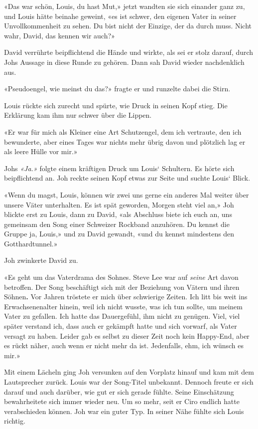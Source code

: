 «Das war schön, Louis, du hast Mut,» jetzt wandten sie sich einander
ganz zu, und Louis hätte beinahe geweint, «es ist schwer, den eigenen
Vater in seiner Unvollkommenheit zu sehen. Du bist nicht der Einzige,
der da durch muss. Nicht wahr, David, das kennen wir auch?»

David verrührte beipflichtend die Hände und wirkte, als sei er stolz
darauf, durch Johs Aussage in diese Runde zu gehören. Dann sah David
wieder nachdenklich aus.

«Pseudoengel, wie meinst du das?» fragte er und runzelte dabei die
Stirn.

Louis rückte sich zurecht und spürte, wie Druck in seinen Kopf stieg.
Die Erklärung kam ihm nur schwer über die Lippen.

«Er war für mich als Kleiner eine Art Schutzengel, dem ich vertraute,
den ich bewunderte, aber eines Tages war nichts mehr übrig davon und
plötzlich lag er als leere Hülle vor mir.»

Johs \emph{«Ja.»} folgte einem kräftigen Druck um Louis` Schultern. Es
hörte sich beipflichtend an. Joh reckte seinen Kopf etwas zur Seite und
suchte Louis` Blick.

«Wenn du magst, Louis, können wir zwei uns gerne ein anderes Mal weiter
über unsere Väter unterhalten. Es ist spät geworden, Morgen steht viel
an,» Joh blickte erst zu Louis, dann zu David, «als Abschluss biete ich
euch an, uns gemeinsam den Song einer Schweizer Rockband anzuhören. Du
kennst die Gruppe ja, Louis,» und zu David gewandt, «und du kennst
mindestens den Gotthardtunnel.»

Joh zwinkerte David zu.

«Es geht um das Vaterdrama des Sohnes. Steve Lee war auf \emph{seine}
Art davon betroffen. Der Song beschäftigt sich mit der Beziehung von
Vätern und ihren Söhnen\textbf{.} Vor Jahren tröstete er mich über
schwierige Zeiten. Ich litt bis weit ins Erwachsenenalter hinein, weil
ich nicht wusste, was ich tun sollte, um meinem Vater zu gefallen. Ich
hatte das Dauergefühl, ihm nicht zu genügen. Viel, viel später verstand
ich, dass auch er gekämpft hatte und sich vorwarf, als Vater versagt zu
haben. Leider gab es selbst zu dieser Zeit noch kein Happy-End, aber es
rückt näher, auch wenn er nicht mehr da ist. Jedenfalls, ehm, ich wünsch
es mir.»

Mit einem Lächeln ging Joh versunken auf den Vorplatz hinauf und kam mit
dem Lautsprecher zurück. Louis war der Song-Titel unbekannt. Dennoch
freute er sich darauf und auch darüber, wie gut er sich gerade fühlte.
Seine Einschätzung bewahrheitete sich immer wieder neu. Um so mehr, seit
er Ciro endlich hatte verabschieden können. Joh war ein guter Typ. In
seiner Nähe fühlte sich Louis richtig.

